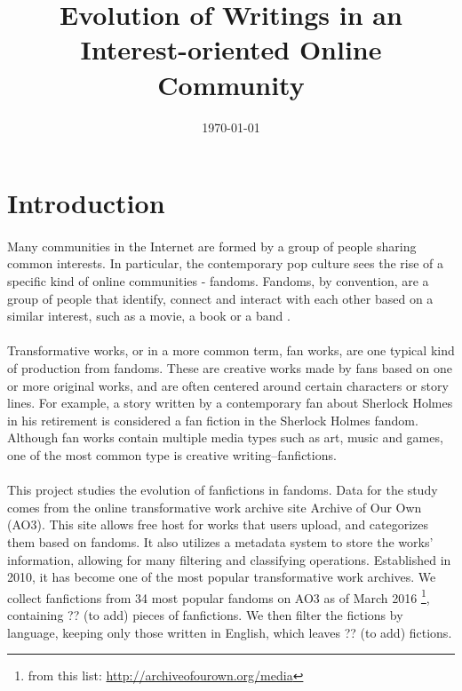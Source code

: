\documentclass[11pt]{article} %
\begin{document}

\title{Evolution of Writings in an Interest-oriented Online Community} %
\date{\today}
\maketitle %

\section{Introduction} %
\label{sec:introduction}
\paragraph{} Many communities in the Internet are formed by a group of people sharing common interests. In particular, the contemporary pop culture sees the rise of a specific kind of online communities - fandoms. Fandoms, by convention, are a group of people that identify, connect and interact with each other based on a similar interest, such as a movie, a book or a band \cite{wiki:fandom}. 

\paragraph{}Transformative works, or in a more common term, fan works, are one typical kind of production from fandoms\cite{wiki:transf_work}. These are creative works made by fans based on one or more original works, and are often centered around certain characters or story lines. For example, a story written by a contemporary fan about Sherlock Holmes in his retirement is considered a fan fiction in the Sherlock Holmes fandom. Although fan works contain multiple media types such as art, music and games, one of the most common type is creative writing--fanfictions.

\paragraph{} This project studies the evolution of fanfictions in fandoms. Data for the study comes from the online transformative work archive site Archive of Our Own (AO3). This site allows free host for works that users upload, and categorizes them based on fandoms. It also utilizes a metadata system to store the works’ information, allowing for many filtering and classifying operations. Established in 2010, it has become one of the most popular transformative work archives. We collect fanfictions from 34 most popular fandoms on AO3 as of March 2016 \footnote{from this list: \url{http://archiveofourown.org/media}}, containing ?? (to add) pieces of fanfictions. We then filter the fictions by language, keeping only those written in English, which leaves ?? (to add) fictions.
\end{document}
